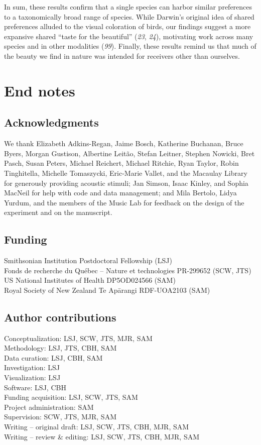 \documentclass[
]{article}
\begin{document}
In sum, these results confirm that a single species can harbor similar
preferences to a taxonomically broad range of species. While Darwin's
original idea of shared preferences alluded to the visual coloration of
birds, our findings suggest a more expansive shared ``taste for the
beautiful'' (\emph{23}, \emph{24}), motivating work across many species
and in other modalities (\emph{99}). Finally, these results remind us
that much of the beauty we find in nature was intended for receivers
other than ourselves.

\section{End notes}\label{end-notes}

\subsection{Acknowledgments}\label{acknowledgments}

We thank Elizabeth Adkins-Regan, Jaime Bosch, Katherine Buchanan, Bruce
Byers, Morgan Gustison, Albertine Leitão, Stefan Leitner, Stephen
Nowicki, Bret Pasch, Susan Peters, Michael Reichert, Michael Ritchie,
Ryan Taylor, Robin Tinghitella, Michelle Tomaszycki, Eric-Marie Vallet,
and the Macaulay Library for generously providing acoustic stimuli; Jan
Simson, Isaac Kinley, and Sophia MacNeil for help with code and data
management; and Mila Bertolo, Lidya Yurdum, and the members of the Music
Lab for feedback on the design of the experiment and on the manuscript.

\subsection{Funding}\label{funding}

Smithsonian Institution Postdoctoral Fellowship (LSJ)\\
Fonds de recherche du Québec -- Nature et technologies PR-299652 (SCW,
JTS)\\
US National Institutes of Health DP5OD024566 (SAM)\\
Royal Society of New Zealand Te Apārangi RDF-UOA2103 (SAM)

\subsection{Author contributions}\label{author-contributions}

Conceptualization: LSJ, SCW, JTS, MJR, SAM\\
Methodology: LSJ, JTS, CBH, SAM\\
Data curation: LSJ, CBH, SAM\\
Investigation: LSJ\\
Visualization: LSJ\\
Software: LSJ, CBH\\
Funding acquisition: LSJ, SCW, JTS, SAM\\
Project administration: SAM\\
Supervision: SCW, JTS, MJR, SAM\\
Writing -- original draft: LSJ, SCW, JTS, CBH, MJR, SAM\\
Writing -- review \& editing: LSJ, SCW, JTS, CBH, MJR, SAM
\end{document}
